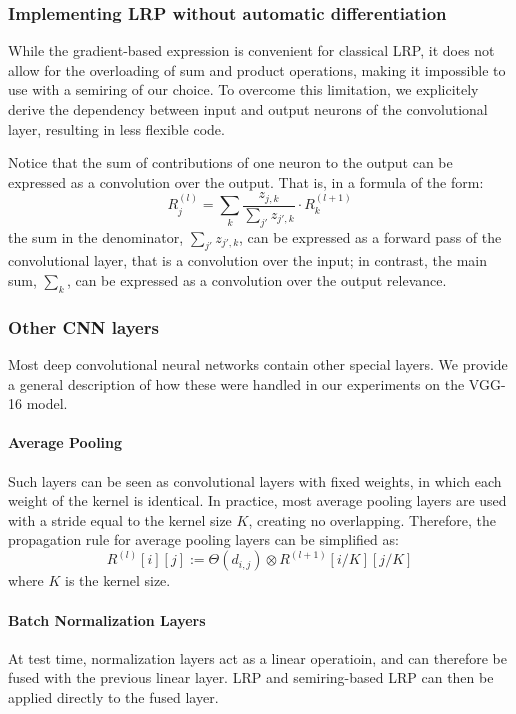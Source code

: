 \documentclass{../cs-classes/cs-classes}
\newcommand*{\1}{\digitsbb{1}}
\newcommand*{\0}{\digitsbb{0}}
\begin{document}
\subsubsection{Implementing LRP without automatic differentiation}
While the gradient-based expression is convenient for classical LRP, it does not allow for the overloading of sum and product operations, making it impossible to use with a semiring of our choice. To overcome this limitation, we explicitely derive the dependency between input and output neurons of the convolutional layer, resulting in less flexible code. 

Notice that the sum of contributions of one neuron to the output can be expressed as a convolution over the output. That is, in a formula of the form:
\begin{equation*}
    R_j^{(l)} = \sum_k \frac{z_{j,k}}{\sum_{j'}z_{j',k}} \cdot R_k^{(l+1)}
\end{equation*}
the sum in the denominator, $\sum_{j'}z_{j',k}$, can be expressed as a forward pass of the convolutional layer, that is a convolution over the input; in contrast, the main sum, $\sum_k$, can be expressed as a convolution over the output relevance.


\subsubsection{Other CNN layers}
Most deep convolutional neural networks contain other special layers. We provide a general description of how these were handled in our experiments on the VGG-16 model.

\paragraph*{Average Pooling}
Such layers can be seen as convolutional layers with fixed weights, in which each weight of the kernel is identical. In practice, most average pooling layers are used with a stride equal to the kernel size $K$, creating no overlapping. Therefore, the propagation rule for average pooling layers can be simplified as:
\begin{equation}
    R^{(l)}[i][j] := \Theta(d_{i,j}) \otimes R^{(l+1)}[i/K][j/K]
\end{equation}
where $K$ is the kernel size.

\paragraph*{Batch Normalization Layers}
At test time, normalization layers act as a linear operatioin, and can therefore be fused with the previous linear layer. LRP and semiring-based LRP can then be applied directly to the fused layer.
\end{document}
